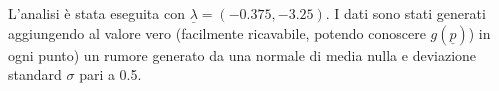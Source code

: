 \documentclass[a4paper,11pt,twoside,openright]{book}							%
\begin{document}
L'analisi è stata eseguita con $\underline \lambda = (-0.375, -3.25)$. I dati sono stati generati aggiungendo al valore vero (facilmente ricavabile, potendo conoscere $g(\underline p)$) in ogni punto) un rumore generato da una normale di media nulla e deviazione standard $\sigma$ pari a 0.5.

\begin{figure}[t]
\centering
{}
\subfigure[Funzione stimata a $t=\frac{\pi}{4}$]

\end{figure}
\end{document}
